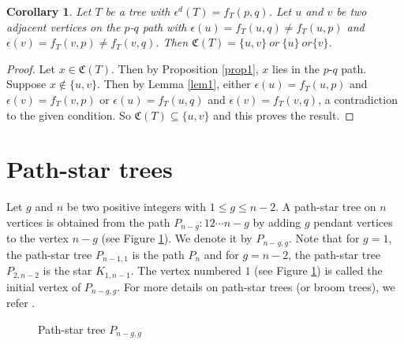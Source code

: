 \documentclass[10pt,a4paper]{amsart}
\newtheorem{corollary}[theorem]{Corollary}
\begin{document}
\begin{corollary}\label{cor2}
Let $T$ be a tree with $\epsilon^d(T)= f_T(p,q)$. Let $u$ and $v$ be two adjacent vertices on the $p$-$q$ path with $\epsilon(u)=f_T(u ,q)\neq f_T(u ,p) $ and $\epsilon(v)=f_T(v,p)\neq f_T(v,q)$. Then $\mathfrak{C}(T)=\{u,v\}\ or\ \{u\}\ or \{v\}$.
\end{corollary}
\begin{proof}
Let $x\in \mathfrak{C}(T)$. Then by Proposition \ref{prop1}, $x$ lies in the $p$-$q$ path. Suppose $x\notin \{u,v\}$. Then by Lemma \ref{lem1}, either $\epsilon(u)=f_T(u ,p)$ and $\epsilon(v)=f_T(v,p)$ or $\epsilon(u)=f_T(u ,q)$ and $\epsilon(v)=f_T(v,q)$, a contradiction to the given condition. So $\mathfrak{C}(T)\subseteq \{u,v\}$ and this proves the result.
\end{proof}

\section{Path-star trees}\label{pst}

Let $g$ and $n$ be two positive integers with $1\leq g\leq n-2$. A path-star tree on $n$ vertices is obtained from the  path $P_{n-g}:12\cdots n-g$ by adding $g$ pendant vertices to the vertex $n-g$ (see Figure \ref{fig3}). We denote it by $P_{n-g,g}$. Note that for $g=1$, the path-star tree $P_{n-1,1}$ is the path $P_n$ and for $g=n-2$, the path-star tree $P_{2,n-2}$ is the star $K_{1,n-1}$. The vertex numbered $1$ (see Figure \ref{fig3}) is called the initial vertex of $P_{n-g,g}$. For more details on path-star trees (or broom trees), we refer \cite{Na, Des, Klp}.

\begin{figure}[h]
    \centering
\caption{Path-star tree $P_{n-g,g}$}\label{fig3}
\end{figure}
\end{document}
